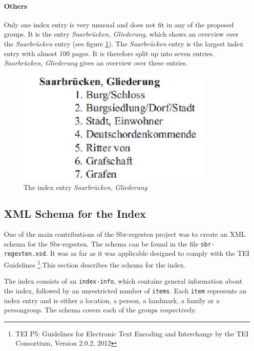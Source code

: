 \paragraph{Others}
\label{sec:other-index-entry}
Only one index entry is very unusual and does not fit in any of the proposed groups. It is the entry \textit{Saarbrücken, Gliederung}, which shows an overview over the \textit{Saarbrücken} entry (see figure \ref{fig:sb-gliederung}). The \textit{Saarbrücken} entry is the largest index entry with almost 100 pages. It is therefore split up into seven entries. \textit{Saarbrücken, Gliederung} gives an overview over these entries.

\begin{figure}[h]
  \centering
  \includegraphics[scale=0.6]{img/sb-gliederung}
  \caption{The index entry \textit{Saarbrücken, Gliederung}}
  \label{fig:sb-gliederung}
\end{figure}


\subsection{XML Schema for the Index}

One of the main contributions of the Sbr-regesten project was to create an XML schema for the Sbr-regesten. The schema can be found in the file \texttt{sbr-regesten.xsd}.
It was as far as it was applicable designed to comply with the TEI Guidelines \footnote{TEI P5: Guidelines for Electronic Text Encoding and Interchange by the TEI Consortium, Version 2.0.2, 2012}.This section describes the schema for the index.

The index consists of an \texttt{index-info}, which contains general information about the index, followed by an unrestricted number of \texttt{items}. Each \texttt{item} represents an index entry and is either a location, a person, a landmark, a family or a persongroup. The schema covers each of the groups respectively.

